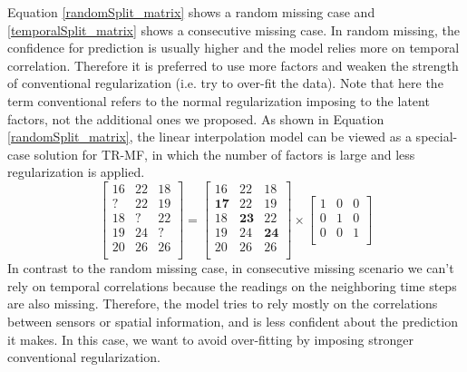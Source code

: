 Equation \ref{randomSplit_matrix} shows a random missing case and \ref{temporalSplit_matrix} shows a consecutive missing case. In random missing, the confidence for prediction is usually higher and the model relies more on temporal correlation. Therefore it is preferred to use more factors and weaken the strength of conventional regularization (i.e. try to over-fit the data). Note that here the term conventional refers to the normal regularization imposing to the latent factors, not the additional ones we proposed. 
As shown in Equation \ref{randomSplit_matrix}, the linear interpolation model can be viewed as a special-case solution for TR-MF, in which the number of factors is large and less regularization is applied. 
\begin{equation}
\label{randomSplit_matrix}
\begin{bmatrix}
16 & 22 & 18\\
 ? & 22 & 19\\
18 &  ?	& 22\\
19 & 24 &  ?\\
20 & 26 & 26\\
\end{bmatrix} 
= 
\begin{bmatrix}
16 & 22 & 18\\
\mathbf{17} & 22 & 19\\
18 & \mathbf{23}	& 22\\
19 & 24 & \mathbf{24}\\
20 & 26 & 26\\
\end{bmatrix} 
\times
\begin{bmatrix}
1 & 0 & 0\\
0 & 1 & 0\\
0 & 0 & 1\\
\end{bmatrix} 
\end{equation}
In contrast to the random missing case, in consecutive missing scenario we can't rely on temporal correlations because the readings on the neighboring time steps are also missing. Therefore, the model tries to rely mostly on the correlations between sensors or spatial information, and is less confident about the prediction it makes. In this case, we want to avoid over-fitting by imposing stronger conventional regularization.
